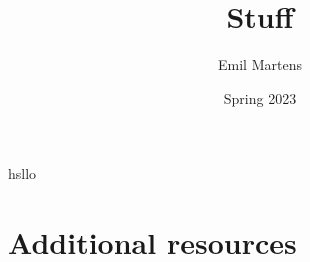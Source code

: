 \documentclass[british,titlepage,oneside]{ntnuthesis}
\title{Stuff}
\author{Emil Martens}
\date{Spring 2023}
\begin{document}
\tableofcontents
\pagebreak

% 
% 
% 
% 
% 
% 

hsllo
\chapter*{\bibname}
\printbibliography[heading=none]

\chapter{Additional resources}



% 
\end{document}
